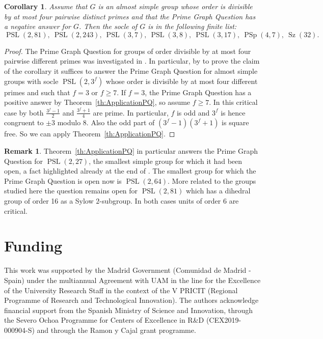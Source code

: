 \documentclass[11pt, a4paper]{amsart}
\newtheorem{corollary}[theorem]{Corollary}
\theoremstyle{definition}
\theoremstyle{definition}
\newtheorem{remark}[theorem]{Remark}
\newcommand{\PSL}{{\operatorname{PSL}}}
\renewcommand{\geq}{\geqslant}
\begin{document}
\begin{corollary}
Assume that  $G$ is an almost simple group whose order is divisible by at most four pairwise distinct primes and that the Prime Graph Question has a negative answer for $G$. Then the socle of $G$ is in the following finite list:
\[\PSL(2,81), \ \PSL(2,243), \ \PSL(3,7), \ \PSL(3,8), \ \PSL(3,17), \ \operatorname{PSp}(4,7), \ \operatorname{Sz}(32). \]
\end{corollary}
\begin{proof}
The Prime Graph Question for groups of order divisible by at most four pairwise different primes was investigated in \cite{BachleMargolis4primaryI, BachleMargolis4primaryII}. In particular, by \cite[Theorem A]{BachleMargolis4primaryII} to prove the claim of the corollary it suffices to answer the Prime Graph Question for almost simple groups with socle $\PSL(2,3^f)$ whose order is divisible by at most four different primes and such that $f=3$ or $f \geq 7$. If $f=3$, the Prime Graph Question has a positive answer by Theorem~\ref{th:ApplicationPQ}, so assume $f \geq 7$. In this critical case by \cite[Theorem B]{BugeaudCaoMignotte} both $\frac{3^f-1}{2}$ and $\frac{3^f+1}{4}$ are prime. In particular, $f$ is odd and $3^f$ is hence congruent to $\pm 3$ modulo $8$. Also the odd part of $(3^f-1)(3^f+1)$ is square free. So we can apply Theorem~\ref{th:ApplicationPQ}.
\end{proof}

\begin{remark}
Theorem~\ref{th:ApplicationPQ} in particular answers the Prime Graph Question for $\PSL(2,27)$, the smallest simple group for which it had been open, a fact highlighted already at the end of \cite{HertweckHoefertKimmerle}. The smallest group for which the Prime Graph Question is open now is $\PSL(2,64)$. More related to the groups studied here the question remains open for $\PSL(2,81)$ which has a dihedral group of order 16 as a Sylow $2$-subgroup. In both cases units of order $6$ are critical.
\end{remark}

%

\section*{Funding}
This work was supported by the Madrid Government (Comunidad de Madrid - Spain) under the multiannual Agreement with UAM in the line for the Excellence of the University Research Staff in the context of the V PRICIT (Regional Programme of Research and Technological Innovation). The authors acknowledge financial support from the Spanish Ministry of Science and Innovation, through the Severo Ochoa Programme for Centers of Excellence in R\&D (CEX2019-000904-S) and through the Ramon y Cajal grant programme.



\end{document}
